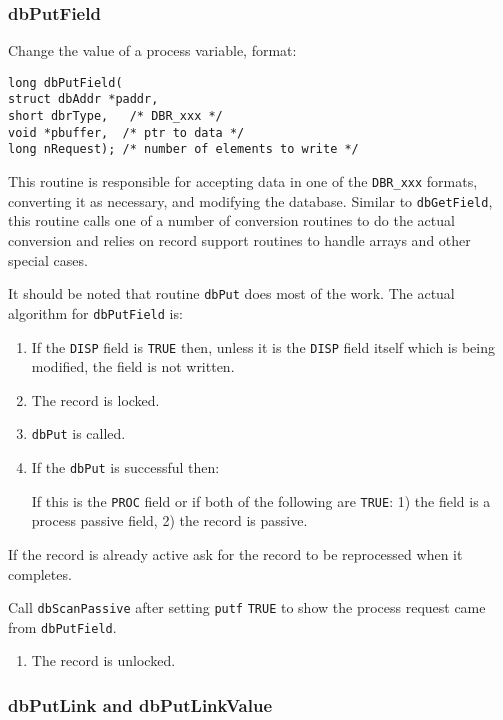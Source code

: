 \subsubsection{dbPutField}

Change the value of a process variable, format:

\begin{verbatim}long dbPutField(
struct dbAddr *paddr,
short dbrType,   /* DBR_xxx */
void *pbuffer,  /* ptr to data */
long nRequest); /* number of elements to write */
\end{verbatim}This routine is responsible for accepting data in one of the \verb|DBR_xxx| formats, converting it as necessary, and modifying 
the database. Similar to \verb|dbGetField|, this routine calls one of a number of conversion routines to do the actual 
conversion and relies on record support routines to handle arrays and other special cases.

It should be noted that routine \verb|dbPut| does most of the work. The actual algorithm for \verb|dbPutField| is:

\begin{enumerate}\item If the \verb|DISP| field is \verb|TRUE| then, unless it is the \verb|DISP| field itself which is being modified, the field is not written.

\item The record is locked.

\item \verb|dbPut| is called.

\item If the \verb|dbPut| is successful then:

If this is the \verb|PROC| field or if both of the following are \verb|TRUE|: 1) the field is a process passive field, 2) the record is 
passive.

\end{enumerate}If the record is already active ask for the record to be reprocessed when it completes.

Call \verb|dbScanPassive| after setting \verb|putf| \verb|TRUE| to show the process request came from \verb|dbPutField|.

\begin{enumerate}\item The record is unlocked.

\end{enumerate}\subsubsection{dbPutLink and dbPutLinkValue}

